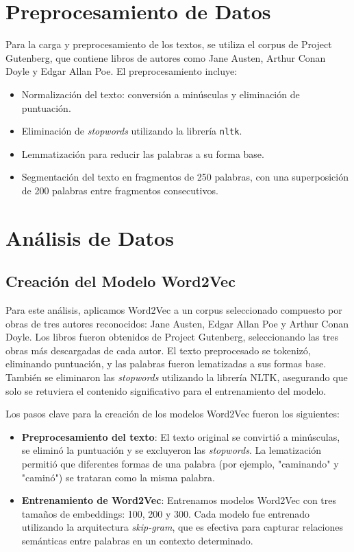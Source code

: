 \documentclass[a4]{article}
\begin{document}
\section{Preprocesamiento de Datos}
Para la carga y preprocesamiento de los textos, se utiliza el corpus de Project Gutenberg, que contiene libros de autores como Jane Austen, Arthur Conan Doyle y Edgar Allan Poe. El preprocesamiento incluye:
\begin{itemize}
    \item Normalización del texto: conversión a minúsculas y eliminación de puntuación.
    \item Eliminación de \textit{stopwords} utilizando la librería \texttt{nltk}.
    \item Lemmatización para reducir las palabras a su forma base.
    \item Segmentación del texto en fragmentos de 250 palabras, con una superposición de 200 palabras entre fragmentos consecutivos.
\end{itemize}

\section{Análisis de Datos}

\subsection{Creación del Modelo Word2Vec}

Para este análisis, aplicamos Word2Vec a un corpus seleccionado compuesto por obras de tres autores reconocidos: Jane Austen, Edgar Allan Poe y Arthur Conan Doyle. Los libros fueron obtenidos de Project Gutenberg, seleccionando las tres obras más descargadas de cada autor. El texto preprocesado se tokenizó, eliminando puntuación, y las palabras fueron lematizadas a sus formas base. También se eliminaron las \textit{stopwords} utilizando la librería NLTK, asegurando que solo se retuviera el contenido significativo para el entrenamiento del modelo.

Los pasos clave para la creación de los modelos Word2Vec fueron los siguientes:
\begin{itemize}
    \item \textbf{Preprocesamiento del texto}: El texto original se convirtió a minúsculas, se eliminó la puntuación y se excluyeron las \textit{stopwords}. La lematización permitió que diferentes formas de una palabra (por ejemplo, "caminando" y "caminó") se trataran como la misma palabra.
    \item \textbf{Entrenamiento de Word2Vec}: Entrenamos modelos Word2Vec con tres tamaños de embeddings: 100, 200 y 300. Cada modelo fue entrenado utilizando la arquitectura \textit{skip-gram}, que es efectiva para capturar relaciones semánticas entre palabras en un contexto determinado.
\end{itemize}
\end{document}
